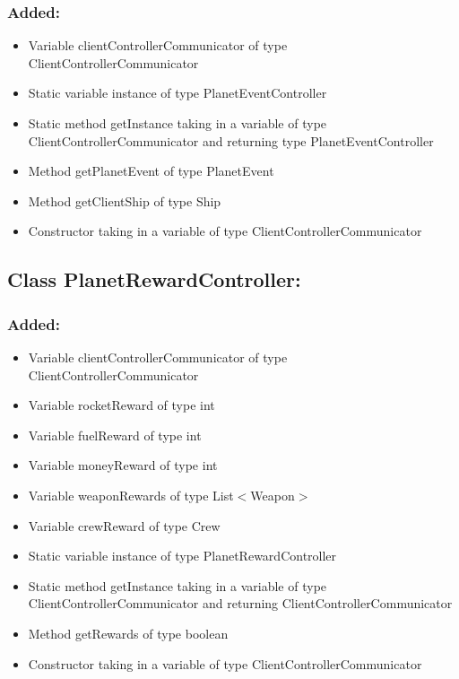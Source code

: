 \documentclass{article}
\begin{document}
\subsubsection{Added:}
\begin{itemize}
\item Variable clientControllerCommunicator of type ClientControllerCommunicator
\item Static variable instance of type PlanetEventController
\item Static method getInstance taking in a variable of type ClientControllerCommunicator and returning type PlanetEventController
\item Method getPlanetEvent of type PlanetEvent
\item Method getClientShip of type Ship
\item Constructor taking in a variable of type ClientControllerCommunicator
\end{itemize}


\subsection{Class PlanetRewardController:}

\subsubsection{Added:}
\begin{itemize}
\item Variable clientControllerCommunicator of type ClientControllerCommunicator
\item Variable rocketReward of type int
\item Variable fuelReward of type int
\item Variable moneyReward of type int
\item Variable weaponRewards of type List$<$Weapon$>$
\item Variable crewReward of type Crew
\item Static variable instance of type PlanetRewardController
\item Static method getInstance taking in a variable of type ClientControllerCommunicator and returning ClientControllerCommunicator
\item Method getRewards of type boolean
\item Constructor taking in a variable of type ClientControllerCommunicator
\end{itemize}
\end{document}
